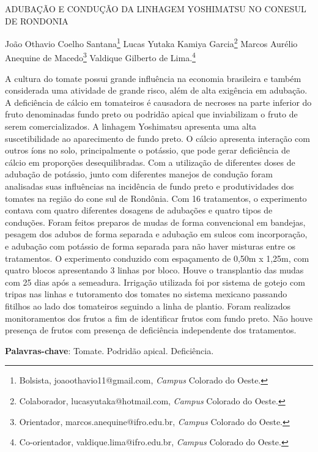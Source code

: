 \documentclass[article,12pt,onesidea,4paper,english,brazil]{abntex2}
\begin{document}
	
	
	\frenchspacing 
	
	\begin{center}
		\LARGE ADUBAÇÃO E CONDUÇÃO DA LINHAGEM YOSHIMATSU NO CONESUL DE RONDONIA
		
		\normalsize
		João Othavio Coelho Santana\footnote{Bolsista, joaoothavio11@gmail.com, \textit{Campus} Colorado do Oeste.} 
		Lucas Yutaka Kamiya Garcia\footnote{Colaborador, lucasyutaka@hotmail.com, \textit{Campus} Colorado do Oeste.} 
		Marcos Aurélio Anequine de Macedo\footnote{Orientador, marcos.anequine@ifro.edu.br, \textit{Campus} Colorado do Oeste.} 
		Valdique Gilberto de Lima.\footnote{Co-orientador, valdique.lima@ifro.edu.br, \textit{Campus} Colorado do Oeste.} 
	\end{center}
	
	\noindent A cultura do tomate possui grande influência na economia brasileira e também
	considerada uma atividade de grande risco, além de alta exigência em adubação. A
	deficiência de cálcio em tomateiros é causadora de necroses na parte inferior do
	fruto denominadas fundo preto ou podridão apical que inviabilizam o fruto de serem
	comercializados. A linhagem Yoshimatsu apresenta uma alta suscetibilidade ao
	aparecimento de fundo preto. O cálcio apresenta interação com outros íons no solo,
	principalmente o potássio, que pode gerar deficiência de cálcio em proporções
	desequilibradas. Com a utilização de diferentes doses de adubação de potássio,
	junto com diferentes manejos de condução foram analisadas suas influências na
	incidência de fundo preto e produtividades dos tomates na região do cone sul de
	Rondônia. Com 16 tratamentos, o experimento contava com quatro diferentes
	dosagens de adubações e quatro tipos de conduções. Foram feitos preparos de
	mudas de forma convencional em bandejas, pesagem dos adubos de forma
	separada e adubação em sulcos com incorporação, e adubação com potássio de
	forma separada para não haver misturas entre os tratamentos. O experimento
	conduzido com espaçamento de 0,50m x 1,25m, com quatro blocos apresentando 3
	linhas por bloco. Houve o transplantio das mudas com 25 dias após a semeadura.
	Irrigação utilizada foi por sistema de gotejo com tripas nas linhas e tutoramento dos
	tomates no sistema mexicano passando fitilhos ao lado dos tomateiros seguindo a
	linha de plantio. Foram realizados monitoramentos dos frutos a fim de identificar
	frutos com fundo preto. Não houve presença de frutos com presença de deficiência
	independente dos tratamentos.
	
	\vspace{\onelineskip}
	
	\noindent
	\textbf{Palavras-chave}: Tomate. Podridão apical. Deficiência.
	
\end{document}
